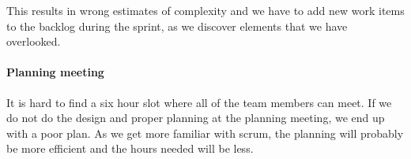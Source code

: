 This results in wrong estimates of complexity and we have to add new work items to the backlog during the sprint, as we discover elements that we have overlooked. 

\paragraph{Planning meeting}
It is hard to find a six hour slot where all of the team members can meet. If we do not do the design and proper planning at the planning meeting, we end up with a poor plan. As we get more familiar with \Gls{scrum}, the planning will probably be more efficient and the hours needed will be less. 

